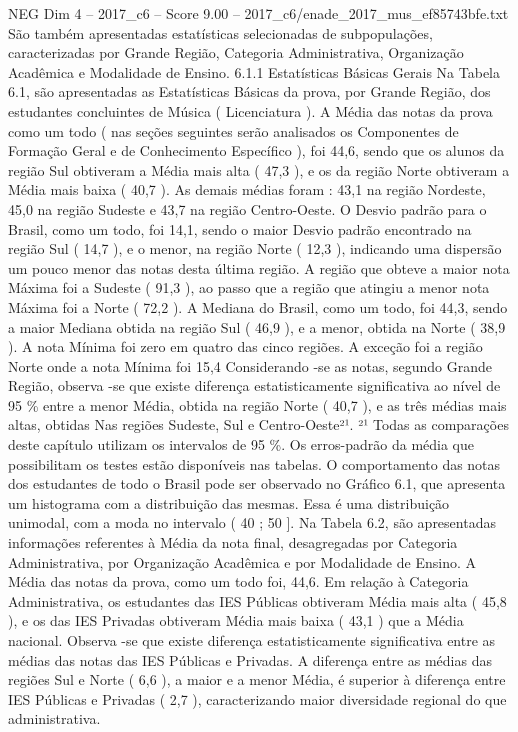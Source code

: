 \begin{textsample}{NEG Dim 4 – 2017\_c6 – Score 9.00 – 2017\_c6/enade\_2017\_mus\_ef85743bfe.txt}
São também apresentadas estatísticas selecionadas de subpopulações, caracterizadas por Grande Região, Categoria Administrativa, Organização Acadêmica e Modalidade de Ensino. 6.1.1 Estatísticas Básicas Gerais Na Tabela 6.1, são apresentadas as Estatísticas Básicas da prova, por Grande Região, dos estudantes concluintes de Música ( Licenciatura ).
A Média das notas da prova como um todo ( nas seções seguintes serão analisados os Componentes de Formação Geral e de Conhecimento Específico ), foi 44,6, sendo que os alunos da região Sul obtiveram a Média mais alta ( 47,3 ), e os da região Norte obtiveram a Média mais baixa ( 40,7 ).
As demais médias foram : 43,1 na região Nordeste, 45,0 na região Sudeste e 43,7 na região Centro-Oeste.
O Desvio padrão para o Brasil, como um todo, foi 14,1, sendo o maior Desvio padrão encontrado na região Sul ( 14,7 ), e o menor, na região Norte ( 12,3 ), indicando uma dispersão um pouco menor das notas desta última região.
A região que obteve a maior nota Máxima foi a Sudeste ( 91,3 ), ao passo que a região que atingiu a menor nota Máxima foi a Norte ( 72,2 ).
A Mediana do Brasil, como um todo, foi 44,3, sendo a maior Mediana obtida na região Sul ( 46,9 ), e a menor, obtida na Norte ( 38,9 ).
A nota Mínima foi zero em quatro das cinco regiões.
A exceção foi a região Norte onde a nota Mínima foi 15,4 Considerando -se as notas, segundo Grande Região, observa -se que existe diferença estatisticamente significativa ao nível de 95 \% entre a menor Média, obtida na região Norte ( 40,7 ), e as três médias mais altas, obtidas Nas regiões Sudeste, Sul e Centro-Oeste²¹. ²¹ Todas as comparações deste capítulo utilizam os intervalos de 95 \%.
Os erros-padrão da média que possibilitam os testes estão disponíveis nas tabelas.
O comportamento das notas dos estudantes de todo o Brasil pode ser observado no Gráfico 6.1, que apresenta um histograma com a distribuição das mesmas.
Essa é uma distribuição unimodal, com a moda no intervalo ( 40 ; 50 ].
Na Tabela 6.2, são apresentadas informações referentes à Média da nota final, desagregadas por Categoria Administrativa, por Organização Acadêmica e por Modalidade de Ensino.
A Média das notas da prova, como um todo foi, 44,6.
Em relação à Categoria Administrativa, os estudantes das IES Públicas obtiveram Média mais alta ( 45,8 ), e os das IES Privadas obtiveram Média mais baixa ( 43,1 ) que a Média nacional.
Observa -se que existe diferença estatisticamente significativa entre as médias das notas das IES Públicas e Privadas.
A diferença entre as médias das regiões Sul e Norte ( 6,6 ), a maior e a menor Média, é superior à diferença entre IES Públicas e Privadas ( 2,7 ), caracterizando maior diversidade regional do que administrativa.

\end{textsample}
